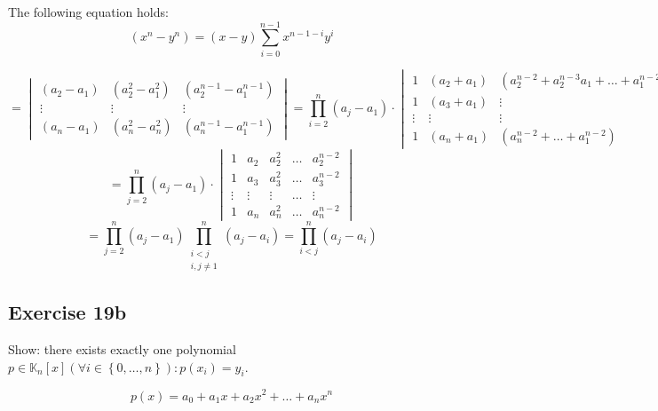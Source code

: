 \documentclass[a4paper]{article}
\theoremstyle{definition}
\newcommand\set[1]{\left\{#1\right\}}
\begin{document}
The following equation holds:
\[
  (x^n - y^n) = (x - y) \sum_{i=0}^{n-1} x^{n-1-i} y^i
\]

\[
  =
  \begin{vmatrix}
    (a_2 - a_1) & (a_2^2 - a_1^2) & (a_2^{n-1} - a_1^{n-1}) \\
    \vdots      & \vdots          & \vdots \\
    (a_n - a_1) & (a_n^2 - a_n^2) & (a_n^{n-1} - a_1^{n-1})
  \end{vmatrix}
  = \prod_{i=2}^n (a_j - a_1) \cdot
  \begin{vmatrix}
    1      & (a_2 + a_1) & (a_2^{n-2} + a_2^{n-3} a_1 + \ldots + a_1^{n-2}) \\
    1      & (a_3 + a_1) & \vdots \\
    \vdots & \vdots      & \vdots \\
    1      & (a_n + a_1) & (a_n^{n-2} + \ldots + a_1^{n-2})
  \end{vmatrix}
\] \[
  = \prod_{j=2}^n (a_j - a_1) \cdot
  \begin{vmatrix}
    1      & a_2    & a_2^2  & \ldots & a_2^{n-2} \\
    1      & a_3    & a_3^2  & \ldots & a_3^{n-2} \\
    \vdots & \vdots & \vdots & \ldots & \vdots \\
    1      & a_n    & a_n^2  & \ldots & a_n^{n-2}
  \end{vmatrix}
\] \[
  = \prod_{j=2}^n (a_j - a_1) \prod_{\substack{i < j \\ i,j \neq 1}}^n (a_j - a_i) = \prod_{i < j}^n (a_j - a_i)
\]

\subsection{Exercise 19b}

Show: there exists exactly one polynomial $p \in \mathbb K_n[x] (\forall i \in \set{0, \ldots, n}): p(x_i) = y_i$.

\[ p(x) = a_0 + a_1 x + a_2 x^2 + \ldots + a_n x^n \]
\end{document}
